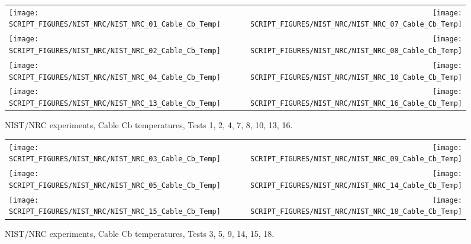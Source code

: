 \begin{figure}[p]
\begin{tabular*}{\textwidth}{l@{\extracolsep{\fill}}r}
\texttt{[image: SCRIPT\_FIGURES/NIST\_NRC/NIST\_NRC\_01\_Cable\_Cb\_Temp]} &
\texttt{[image: SCRIPT\_FIGURES/NIST\_NRC/NIST\_NRC\_07\_Cable\_Cb\_Temp]} \\
\texttt{[image: SCRIPT\_FIGURES/NIST\_NRC/NIST\_NRC\_02\_Cable\_Cb\_Temp]} &
\texttt{[image: SCRIPT\_FIGURES/NIST\_NRC/NIST\_NRC\_08\_Cable\_Cb\_Temp]} \\
\texttt{[image: SCRIPT\_FIGURES/NIST\_NRC/NIST\_NRC\_04\_Cable\_Cb\_Temp]} &
\texttt{[image: SCRIPT\_FIGURES/NIST\_NRC/NIST\_NRC\_10\_Cable\_Cb\_Temp]} \\
\texttt{[image: SCRIPT\_FIGURES/NIST\_NRC/NIST\_NRC\_13\_Cable\_Cb\_Temp]} &
\texttt{[image: SCRIPT\_FIGURES/NIST\_NRC/NIST\_NRC\_16\_Cable\_Cb\_Temp]}
\end{tabular*}
\caption[NIST/NRC experiments, Cable Cb temperatures, Tests 1, 2, 4, 7, 8, 10, 13, 16]{NIST/NRC experiments, Cable Cb temperatures, Tests 1, 2, 4, 7, 8, 10, 13, 16.}
\label{NIST_NRC_Cable_Cb_Closed}
\end{figure}

\begin{figure}[p]
\begin{tabular*}{\textwidth}{l@{\extracolsep{\fill}}r}
\texttt{[image: SCRIPT\_FIGURES/NIST\_NRC/NIST\_NRC\_03\_Cable\_Cb\_Temp]} &
\texttt{[image: SCRIPT\_FIGURES/NIST\_NRC/NIST\_NRC\_09\_Cable\_Cb\_Temp]} \\
\texttt{[image: SCRIPT\_FIGURES/NIST\_NRC/NIST\_NRC\_05\_Cable\_Cb\_Temp]} &
\texttt{[image: SCRIPT\_FIGURES/NIST\_NRC/NIST\_NRC\_14\_Cable\_Cb\_Temp]} \\
\texttt{[image: SCRIPT\_FIGURES/NIST\_NRC/NIST\_NRC\_15\_Cable\_Cb\_Temp]} &
\texttt{[image: SCRIPT\_FIGURES/NIST\_NRC/NIST\_NRC\_18\_Cable\_Cb\_Temp]}
\end{tabular*}
\caption[NIST/NRC experiments, Cable Cb temperatures, Tests 3, 5, 9, 14, 15, 18]{NIST/NRC experiments, Cable Cb temperatures, Tests 3, 5, 9, 14, 15, 18.}
\label{NIST_NRC_Cable_Cb_Open}
\end{figure}

